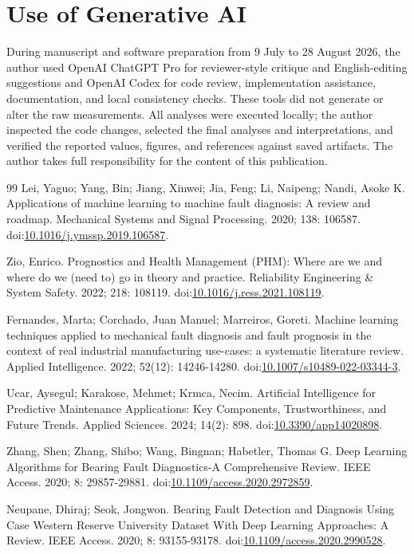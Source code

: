 \documentclass[11pt]{article}
\begin{document}
\section*{Use of Generative AI}
During manuscript and software preparation from 9 July to 28 August 2026, the author used OpenAI ChatGPT Pro for reviewer-style critique and English-editing suggestions and OpenAI Codex for code review, implementation assistance, documentation, and local consistency checks. These tools did not generate or alter the raw measurements. All analyses were executed locally; the author inspected the code changes, selected the final analyses and interpretations, and verified the reported values, figures, and references against saved artifacts. The author takes full responsibility for the content of this publication.

\begin{thebibliography}{99}
 Lei, Yaguo; Yang, Bin; Jiang, Xinwei; Jia, Feng; Li, Naipeng; Nandi, Asoke K. Applications of machine learning to machine fault diagnosis: A review and roadmap. Mechanical Systems and Signal Processing. 2020; 138: 106587. doi:\url{10.1016/j.ymssp.2019.106587}.

 Zio, Enrico. Prognostics and Health Management (PHM): Where are we and where do we (need to) go in theory and practice. Reliability Engineering \& System Safety. 2022; 218: 108119. doi:\url{10.1016/j.ress.2021.108119}.

 Fernandes, Marta; Corchado, Juan Manuel; Marreiros, Goreti. Machine learning techniques applied to mechanical fault diagnosis and fault prognosis in the context of real industrial manufacturing use-cases: a systematic literature review. Applied Intelligence. 2022; 52(12): 14246-14280. doi:\url{10.1007/s10489-022-03344-3}.

 Ucar, Aysegul; Karakose, Mehmet; Krmca, Necim. Artificial Intelligence for Predictive Maintenance Applications: Key Components, Trustworthiness, and Future Trends. Applied Sciences. 2024; 14(2): 898. doi:\url{10.3390/app14020898}.

 Zhang, Shen; Zhang, Shibo; Wang, Bingnan; Habetler, Thomas G. Deep Learning Algorithms for Bearing Fault Diagnostics-A Comprehensive Review. IEEE Access. 2020; 8: 29857-29881. doi:\url{10.1109/access.2020.2972859}.

 Neupane, Dhiraj; Seok, Jongwon. Bearing Fault Detection and Diagnosis Using Case Western Reserve University Dataset With Deep Learning Approaches: A Review. IEEE Access. 2020; 8: 93155-93178. doi:\url{10.1109/access.2020.2990528}.


\end{thebibliography}
\end{document}
